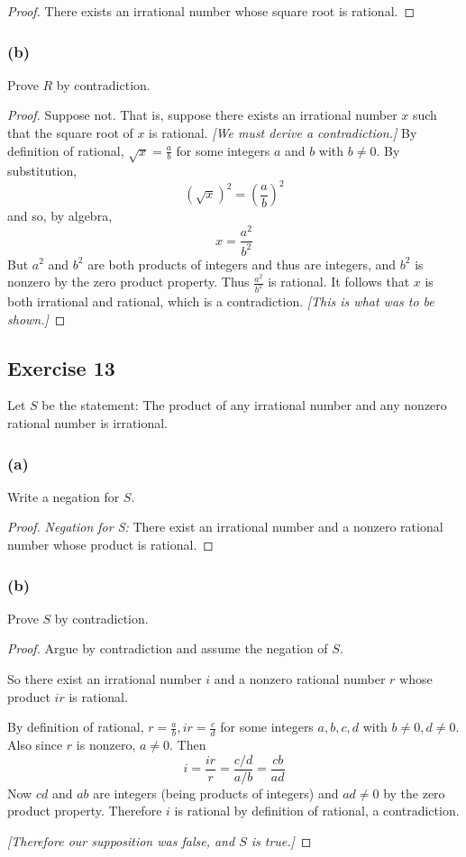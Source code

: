 \documentclass[14pt]{extarticle}
\begin{document}
\begin{proof}
    There exists an irrational number whose square root is rational.
\end{proof}

\subsubsection{(b)}
Prove $R$ by contradiction.

\begin{proof}
    Suppose not. That is, suppose there exists an irrational number $x$ such that the square root of $x$ is rational. {\it [We must derive a contradiction.]} By definition of rational, $\sqrt{x} = \frac{a}{b}$ for some integers $a$ and $b$ with $b \neq 0$. By substitution,
    \[
        (\sqrt{x})^2 = \left(\frac{a}{b}\right)^2
    \]
    and so, by algebra,
    \[
        x = \frac{a^2}{b^2}
    \]
    But $a^2$ and $b^2$ are both products of integers and thus
    are integers, and $b^2$ is nonzero by the zero product
    property. Thus $\frac{a^2}{b^2}$ is rational. It follows that $x$ is both irrational and rational, which is a contradiction. {\it [This is what was to be shown.]}
\end{proof}

\subsection{Exercise 13}
Let $S$ be the statement: The product of any irrational number and any nonzero rational number is irrational.

\subsubsection{(a)}
Write a negation for $S$.

\begin{proof}
    {\it Negation for S:} There exist an irrational number and a nonzero rational number whose product is rational.
\end{proof}

\subsubsection{(b)}
Prove $S$ by contradiction.

\begin{proof}
    Argue by contradiction and assume the negation of $S$.

    So there exist an irrational number $i$ and a nonzero rational number $r$ whose product $ir$ is rational.

    By definition of rational, $r = \frac{a}{b}, ir = \frac{c}{d}$ for some integers $a,b,c,d$ with $b \neq 0, d \neq 0$. Also since $r$ is nonzero, $a \neq 0$.
    Then
    \[
        i = \frac{ir}{r} = \frac{c/d}{a/b} = \frac{cb}{ad}
    \]
    Now $cd$ and $ab$ are integers (being products of integers) and $ad \neq 0$ by the zero product property. Therefore $i$ is rational by definition of rational, a contradiction.

        {\it [Therefore our supposition was false, and $S$ is true.]}
\end{proof}
\end{document}
